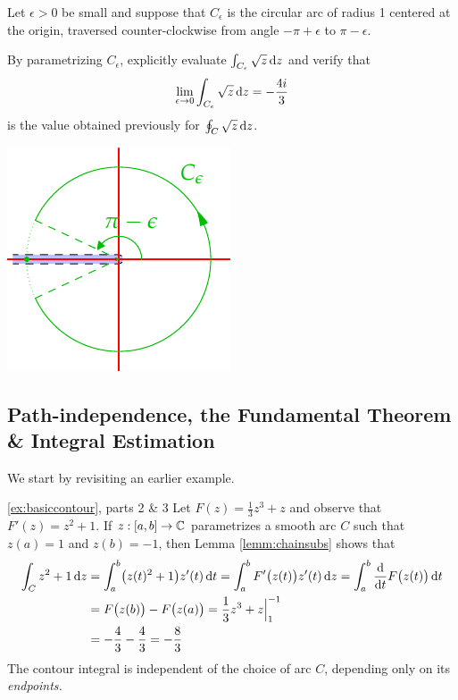 \begin{exercises}
\begin{enumerate}
		
		\begin{minipage}[t]{0.7\linewidth}\vspace{0pt}
			\item Let $\epsilon>0$ be small and suppose that $C_\epsilon$ is the circular arc of radius 1 centered at the origin, traversed counter-clockwise from angle $-\pi+\epsilon$ to $\pi-\epsilon$.\par
			By parametrizing $C_\epsilon$, explicitly evaluate $\int_{C_\epsilon}\sqrt z\,{\mathrm{d} z}$ and verify that
			\[
				\lim_{\epsilon\to 0}\int_{C_\epsilon}\sqrt z\,{\mathrm{d} z} =-\frac{4i}3
			\]
			is the value obtained previously for $\oint_C\sqrt z\,{\mathrm{d} z}$. 
		\end{minipage}
		\hfill
		\begin{minipage}[t]{0.29\linewidth}\vspace{0pt}
			\flushright\includegraphics{contour-branch4}
		\end{minipage}
	
	  
	\end{enumerate}
\end{exercises}
\clearpage




\subsection[The Fundamental Theorem of Calculus]{Path-independence, the Fundamental Theorem \& Integral Estimation}\label{sec:ftc}

We start by revisiting an earlier example.

\begin{example*}{\ref{ex:basiccontour}, parts 2 \& 3}{}
	Let $F(z)=\frac 13z^3+z$ and observe that $F'(z)=z^2+1$. If $z:[a,b]\to \mathbb{C}$ parametrizes a smooth arc $C$ such that $z(a)=1$ and $z(b)=-1$, then Lemma \ref{lemm:chainsubs} shows that
	\begin{align*}
		\int_Cz^2+1\,{\mathrm{d} z}&=\int_a^b\bigl(z(t)^2+1\bigr)z'(t)\,{\mathrm{d} t} =\int_a^bF'\bigl(z(t)\bigr)z'(t)\,{\mathrm{d} z} =\int_a^b\frac{\mathrm{d} }{\mathrm{d} t}F\bigl(z(t)\bigr)\,{\mathrm{d} t}\\
		&=F\bigl(z(b)\bigr)-F\bigl(z(a)\bigr) = \frac 13z^3+z\Big|_1^{-1}\\
		&=-\frac 43-\frac 43=-\frac 83
	\end{align*}
	The contour integral is independent of the choice of arc $C$, depending only on its \emph{endpoints.}
\end{example*}


